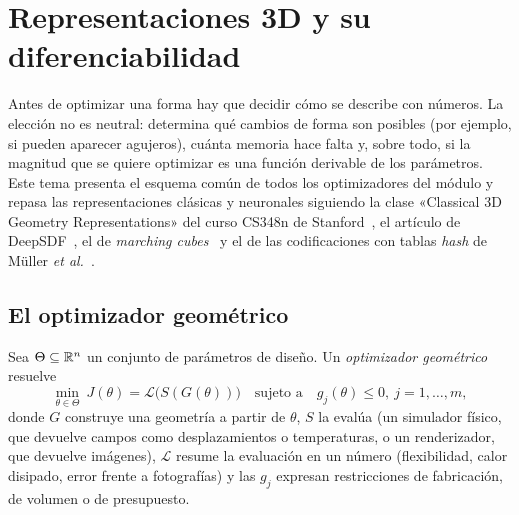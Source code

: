 \chapter{Representaciones 3D y su diferenciabilidad}
\label{tema:1}

Antes de optimizar una forma hay que decidir cómo se describe con números. La elección no es neutral: determina qué cambios de forma son posibles (por ejemplo, si pueden aparecer agujeros), cuánta memoria hace falta y, sobre todo, si la magnitud que se quiere optimizar es una función derivable de los parámetros. Este tema presenta el esquema común de todos los optimizadores del módulo y repasa las representaciones clásicas y neuronales siguiendo la clase «Classical 3D Geometry Representations» del curso CS348n de Stanford~\cite{cs348n}, el artículo de DeepSDF~\cite{deepsdf}, el de \emph{marching cubes}~\cite{mc} y el de las codificaciones con tablas \emph{hash} de Müller \emph{et al.}~\cite{ingp}.

\section{El optimizador geométrico}

\begin{definicion}\label{def:opt-geom}
Sea $\Theta\subseteq\mathbb{R}^n$ un conjunto de parámetros de diseño. Un \emph{optimizador geométrico} resuelve
\[
\min_{\theta\in\Theta}\ J(\theta)=\mathcal{L}\bigl(S(G(\theta))\bigr)\quad\text{sujeto a}\quad g_j(\theta)\le 0,\ j=1,\dots,m,
\]
donde $G$ construye una geometría a partir de $\theta$, $S$ la evalúa (un simulador físico, que devuelve campos como desplazamientos o temperaturas, o un renderizador, que devuelve imágenes), $\mathcal{L}$ resume la evaluación en un número (flexibilidad, calor disipado, error frente a fotografías) y las $g_j$ expresan restricciones de fabricación, de volumen o de presupuesto.
\end{definicion}


